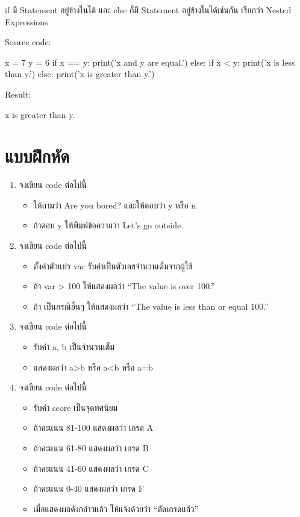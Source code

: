 if มี Statement อยู่ข้างในได้ และ else ก็มี Statement อยู่ข้างในได้เช่นกัน เรียกว่า Nested Expressions

Source code:
\begin{codelist}{}{}
x = 7
y = 6
if x == y: print('x and y are equal.')
else:
    if x < y: print('x is less than y.')
    else: print('x is greater than y.')
\end{codelist}

Result:
\begin{codelist}{}{}
x is greater than y.
\end{codelist}

\section{แบบฝึกหัด}

\begin{enumerate} 
\item  จงเขียน code ต่อไปนี้
\begin{itemize}
\item ให้ถามว่า Are you bored? และให้ตอบว่า y หรือ n
\item ถ้าตอบ y ให้พิมพ์ข้อความว่า Let’s go outside.
\end{itemize}
\item จงเขียน code ต่อไปนี้
\begin{itemize}
\item ตั้งค่าตัวแปร var รับค่าเป็นตัวเลขจำนวนเต็มจากผู้ใช้
\item ถ้า var > 100 ให้แสดงผลว่า “The value is over 100.”
\item ถ้า เป็นกรณีอื่นๆ ให้แสดงผลว่า “The value is less than or equal 100.”
\end{itemize}
\item จงเขียน code ต่อไปนี้
\begin{itemize}
\item รับค่า a, b เป็นจำนวนเต็ม
\item แสดงผลว่า a>b หรือ a<b หรือ a=b
\end{itemize}
\item จงเขียน code ต่อไปนี้
\begin{itemize}
\item รับค่า score เป็นจุดทศนิยม
\item ถ้าคะแนน 81-100 แสดงผลว่า เกรด A
\item ถ้าคะแนน 61-80  แสดงผลว่า เกรด B
\item ถ้าคะแนน 41-60 แสดงผลว่า เกรด C
\item ถ้าคะแนน 0-40 แสดงผลว่า เกรด F
\item เมื่อแสดงผลดังกล่าวแล้ว ให้แจ้งด้วยว่า “ตัดเกรดแล้ว”
\end{itemize}
\end{enumerate}
